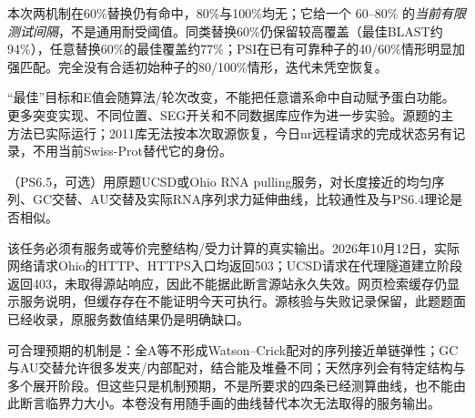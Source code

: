 本次两机制在60\%替换仍有命中，80\%与100\%均无；它给一个 $60$--$80$\% 的\emph{当前有限测试间隔}，不是通用耐受阈值。同类替换60\%仍保留较高覆盖（最佳BLAST约94\%），任意替换60\%的最佳覆盖约77\%；PSI在已有可靠种子的40/60\%情形明显加强匹配。完全没有合适初始种子的80/100\%情形，迭代未凭空恢复。

“最佳”目标和E值会随算法/轮次改变，不能把任意谱系命中自动赋予蛋白功能。更多突变实现、不同位置、SEG开关和不同数据库应作为进一步实验。源题的主方法已实际运行；2011库无法按本次取源恢复，今日nr远程请求的完成状态另有记录，不用当前Swiss-Prot替代它的身份。

\begin{exercise}
（PS6.5，可选）用原题UCSD或Ohio RNA pulling服务，对长度接近的均匀序列、GC交替、AU交替及实际RNA序列求力延伸曲线，比较通性及与PS6.4理论是否相似。
\end{exercise}
\begin{solution}
该任务必须有服务或等价完整结构/受力计算的真实输出。2026年10月12日，实际网络请求Ohio的HTTP、HTTPS入口均返回503；UCSD请求在代理隧道建立阶段返回403，未取得源站响应，因此不能据此断言源站永久失效。网页检索缓存仍显示服务说明，但缓存存在不能证明今天可执行。源核验与失败记录保留，此题题面已经收录，原服务数值结果仍是明确缺口。

可合理预期的机制是：全A等不形成Watson--Crick配对的序列接近单链弹性；GC与AU交替允许很多发夹/内部配对，结合能及堆叠不同；天然序列会有特定结构与多个展开阶段。但这些只是机制预期，不是所要求的四条已经测算曲线，也不能由此断言临界力大小。本卷没有用随手画的曲线替代本次无法取得的服务输出。
\end{solution}
